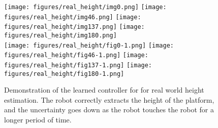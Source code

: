 \documentclass[anon]{l4dc2024}
\begin{document}
\begin{figure}
    \centering
    \texttt{[image: figures/real\_height/img0.png]}
    \texttt{[image: figures/real\_height/img46.png]}
    \texttt{[image: figures/real\_height/img137.png]}
    \texttt{[image: figures/real\_height/img180.png]} \\
    \texttt{[image: figures/real\_height/fig0-1.png]}
    \texttt{[image: figures/real\_height/fig46-1.png]}
    \texttt{[image: figures/real\_height/fig137-1.png]}
    \texttt{[image: figures/real\_height/fig180-1.png]}
    \caption{Demonstration of the learned controller for for real world height estimation. The robot correctly extracts the height of the platform, and the uncertainty goes down as the robot touches the robot for a longer period of time.}
    \label{fig:demo_real}
\end{figure}
\end{document}
